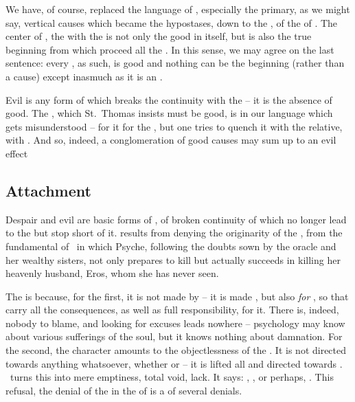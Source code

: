 {{We have, of course, replaced the language of , especially the
primary, as we might say, vertical causes which became the hypostases, down to
the , of the  of . The center
of , the  with the  is not only the
good in itself, but is also the true beginning from which proceed all the
. In this sense, we may agree on the last sentence: every
, as such, is good and nothing can be the beginning (rather than a
cause) except inasmuch as it is an . 

Evil is any form of  which breaks the continuity with the
 -- it is the absence of good. The , which St.~Thomas insists must be good, is in our language
 which gets misunderstood -- for it  for the , but one tries to quench it with the relative, with . And
so, indeed, a conglomeration of good causes may sum up to an evil effect
} %

} %


\subsection{Attachment}

\pa Despair and evil are basic forms of , of broken continuity of
 which no longer lead to the  but stop short of
it.  results from denying the originarity of the , 
from the fundamental %
 of \No\ in which {Psyche}, following the doubts sown by
the oracle and her wealthy sisters, not only prepares to kill but actually
succeeds in killing her heavenly husband, {Eros}, whom she has never seen.

The  is  because, for the first, it is not made by
 -- it is made , but also {\em for} , so that 
carry all the consequences, as well as full responsibility, for it. There is,
indeed, nobody to blame, and looking for
excuses %
leads nowhere -- psychology may know about various sufferings of the soul,
but it knows nothing about damnation. For the second, the 
character amounts to the  objectlessness of the . It is
not directed towards anything whatsoever, whether  or 
-- it is lifted  all  and directed towards
.  \No\ turns this  into 
mere emptiness, total void, lack. It says: , ,
or perhaps, .
This refusal, the denial of the  in the  of
 is a  of several denials.


